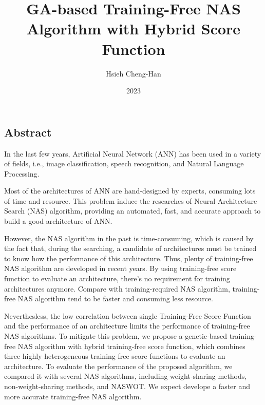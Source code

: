 \documentclass[twocolumn,10pt]{article}
\title{GA-based Training-Free NAS Algorithm with Hybrid Score Function}
\author{Hsieh Cheng-Han}
\date{2023}
\begin{document}
\begin{CJK*}{UTF8}{bsmi}

\maketitle

\section{Abstract}
    In the last few years, Artificial Neural Network (ANN) has been used in a variety of fields, i.e., image classification\cite{}, speech recognition\cite{}, and Natural Language Processing\cite{}.\par
Most of the architectures of ANN are hand-designed by experts, consuming lots of time and resource. This problem induce the researches of Neural Architecture Search (NAS) algorithm, providing an automated, fast, and accurate approach to build a good architecture of ANN.\par
    However, the NAS algorithm\cite{} in the past is time-consuming, which is caused by the fact that, during the searching, a candidate of architectures must be trained to know how the performance of this architecture. Thus, plenty of training-free NAS algorithm are developed in recent years. By using training-free score function to evaluate an architecture, there's no requirement for training architectures anymore. Compare with training-required NAS algorithm, training-free NAS algorithm tend to be faster and consuming less resource.\par
Neverthesless, the low correlation between single Training-Free Score Function and the performance of an architecture limits the performance of training-free NAS algorithms. To mitigate this problem, we propose a genetic-based training-free NAS algorithm with hybrid training-free score function, which combines three highly heterogeneous training-free score functions to evaluate an architecture. To evaluate the performance of the proposed algorithm, we compared it with several NAS algorithms, including weight-sharing methods, non-weight-sharing methods, and NASWOT. We expect develope a faster and more accurate training-free NAS algorithm.\par

\begin{thebibliography}{9}
\end{thebibliography}


\end{CJK*}
\end{document}
